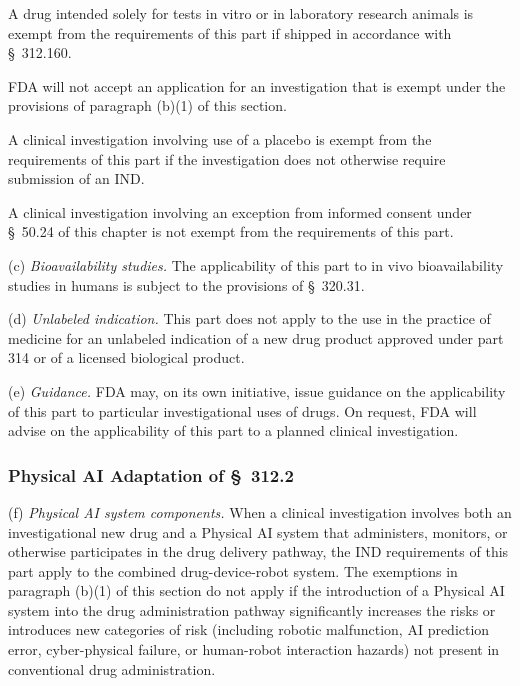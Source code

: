 \documentclass[11pt]{article}
\begin{document}
\begin{description}[leftmargin=0.5cm,style=sameline]
\item[(3)] A drug intended solely for tests in vitro or in laboratory research animals is exempt from the requirements of this part if shipped in accordance with \S~312.160.
\item[(4)] FDA will not accept an application for an investigation that is exempt under the provisions of paragraph (b)(1) of this section.
\item[(5)] A clinical investigation involving use of a placebo is exempt from the requirements of this part if the investigation does not otherwise require submission of an IND.
\item[(6)] A clinical investigation involving an exception from informed consent under \S~50.24 of this chapter is not exempt from the requirements of this part.
\end{description}

(c) \textit{Bioavailability studies.} The applicability of this part to in vivo bioavailability studies in humans is subject to the provisions of \S~320.31.

(d) \textit{Unlabeled indication.} This part does not apply to the use in the practice of medicine for an unlabeled indication of a new drug product approved under part 314 or of a licensed biological product.

(e) \textit{Guidance.} FDA may, on its own initiative, issue guidance on the applicability of this part to particular investigational uses of drugs. On request, FDA will advise on the applicability of this part to a planned clinical investigation.

\subsubsection{Physical AI Adaptation of \S~312.2}

(f) \textit{Physical AI system components.} When a clinical investigation involves both an investigational new drug and a Physical AI system that administers, monitors, or otherwise participates in the drug delivery pathway, the IND requirements of this part apply to the combined drug-device-robot system. The exemptions in paragraph (b)(1) of this section do not apply if the introduction of a Physical AI system into the drug administration pathway significantly increases the risks or introduces new categories of risk (including robotic malfunction, AI prediction error, cyber-physical failure, or human-robot interaction hazards) not present in conventional drug administration.
\end{document}
